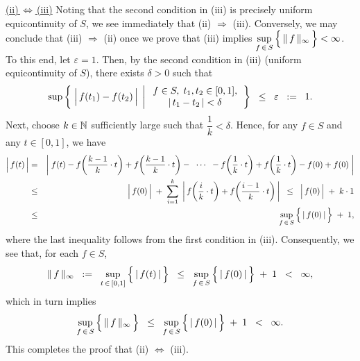 \vskip 0.5cm
\noindent
\underline{(ii)\,$\Longleftrightarrow$\,(iii)}
\vskip 0.1cm
\noindent
Noting that the second condition in (iii) is precisely uniform equicontinuity of $S$,
we see immediately that (ii) $\Longrightarrow$ (iii).
Conversely, we may conclude that (iii) $\Longrightarrow$ (ii) once we prove that
(iii) implies
$\underset{f\,\in\,S}{\sup}\left\{\,\Vert\,\overset{{\color{white}.}}{f}\,\Vert_{\infty}\,\right\} < \infty$.
To this end, let $\varepsilon = 1$.
Then, by the second condition in (iii) (uniform equicontinuity of $S$),
there exists $\delta > 0$ such that
\begin{equation*}
\sup\left\{\;
\left\vert\,\overset{{\color{white}.}}{f}(t_{1}) - f(t_{2})\,\right\vert
\;\left\vert\;
\begin{array}{c} f \in S, \; t_{1},t_{2} \in [0,1], \\ \vert\,t_{1} - t_{2}\,\vert < \delta \end{array}
\right.
\right\}
\;\;\leq\;\; \varepsilon \;\; := \;\; 1.
\end{equation*}
Next, choose $k \in \mathbb{N}$ sufficiently large such that $\dfrac{1}{k} < \delta$.
Hence, for any $f \in S$ and any $t \in [0,1]$, we have
\begin{eqnarray*}
\left\vert\,\overset{{\color{white}.}}{f}(t)\,\right\vert
&=&
	\left\vert\;
	f(t)
	- f\!\left(\frac{k-1}{k}\cdot t\right) + f\!\left(\frac{k-1}{k}\cdot t\right)
	- \;\;\cdots\;\;
	- f\!\left(\frac{1}{k}\cdot t\right) + f\!\left(\frac{1}{k}\cdot t\right)
	- f\!\left(0\right) + f\!\left(0\right)
	\;\right\vert
\\
&\leq&
	\left\vert\,\overset{{\color{white}.}}{f}(0)\,\right\vert
	\;+\; \sum_{i=1}^{k}\;\left\vert\, f\!\left(\frac{i}{k}\cdot t\right) + f\!\left(\frac{i-1}{k}\cdot t\right) \,\right\vert
	\;\;\leq\;\; \left\vert\,\overset{{\color{white}.}}{f}(0)\,\right\vert \;+\; k\cdot 1
\\
&\leq&
	\underset{f\,\in\,S}{\sup}\left\{\,\vert\,\overset{{\color{white}.}}{f}(0)\,\vert\,\right\} \;+\; 1,
\end{eqnarray*}
where the last inequality follows from the first condition in (iii).
Consequently, we see that, for each $f \in S$,
\begin{equation*}
\Vert\,\overset{{\color{white}.}}{f}\,\Vert_{\infty}
\;\; := \;\;
\underset{t\,\in\,[0,1]}{\sup}\left\{\,\vert\,\overset{{\color{white}.}}{f}(t)\,\vert\,\right\}
\;\;\leq\;\;
\underset{f\,\in\,S}{\sup}\left\{\,\vert\,\overset{{\color{white}.}}{f}(0)\,\vert\,\right\} \;+\; 1
\;\;<\;\; \infty,
\end{equation*}
which in turn implies
\begin{equation*}
\underset{f\,\in\,S}{\sup}\left\{\,\Vert\,\overset{{\color{white}.}}{f}\,\Vert_{\infty}\,\right\}
\;\;\leq\;\;
\underset{f\,\in\,S}{\sup}\left\{\,\vert\,\overset{{\color{white}.}}{f}(0)\,\vert\,\right\} \;+\; 1
\;\;<\;\; \infty.
\end{equation*}
This completes the proof that (ii) $\Longleftrightarrow$ (iii).

